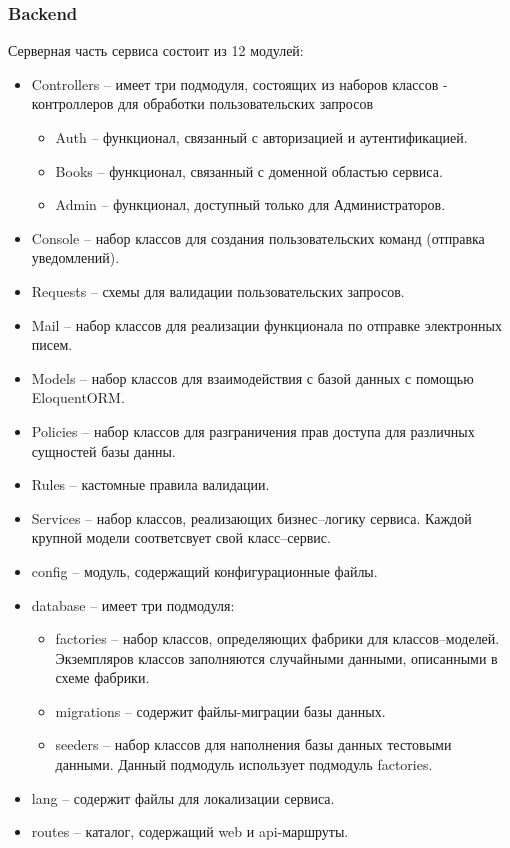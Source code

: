 \documentclass[./project.tex]{subfiles}
\begin{document}
\subsubsection{Backend}
\par
Серверная часть сервиса состоит из 12 модулей:
\begin{itemize}
  \item Controllers – имеет три подмодуля, состоящих из наборов классов - контроллеров для обработки пользовательских запросов
  \begin{itemize}
    \item Auth – функционал, связанный с авторизацией и аутентификацией.
    \item Books – функционал, связанный с доменной областью сервиса.
    \item Admin – функционал, доступный только для Администраторов. 
  \end{itemize}
  \item Console – набор классов для создания пользовательских команд (отправка уведомлений).
  \item Requests – схемы для валидации пользовательских запросов.
  \item Mail – набор классов для реализации функционала по отправке электронных писем.
  \item Models – набор классов для взаимодействия с базой данных с помощью EloquentORM.
  \item Policies – набор классов для разграничения прав доступа для различных сущностей базы данны.
  \item Rules – кастомные правила валидации.
  \item Services – набор классов, реализающих бизнес–логику сервиса. Каждой крупной модели соответсвует свой класс–сервис.
  \item config – модуль, содержащий конфигурационные файлы.
  \item database – имеет три подмодуля:
  \begin{itemize}
    \item factories – набор классов, определяющих фабрики для классов–моделей. Экземпляров классов заполняются случайными данными, описанными в схеме фабрики.
    \item migrations – содержит файлы-миграции базы данных.
    \item seeders – набор классов для наполнения базы данных тестовыми данными. Данный подмодуль использует подмодуль factories.
  \end{itemize}
  \item lang – содержит файлы для локализации сервиса.
  \item routes – каталог, содержащий web и api-маршруты.
\end{itemize}
\end{document}
